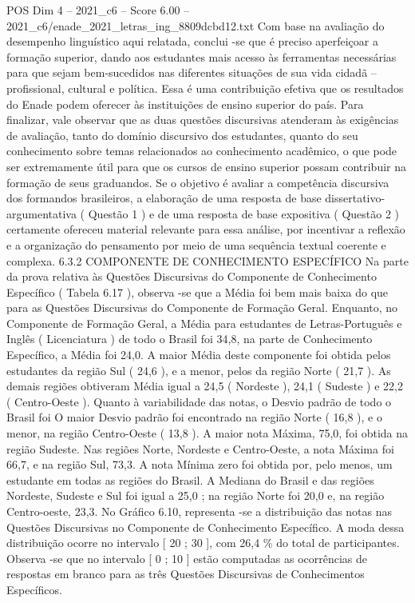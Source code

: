 \begin{textsample}{POS Dim 4 – 2021\_c6 – Score 6.00 – 2021\_c6/enade\_2021\_letras\_ing\_8809dcbd12.txt}
Com base na avaliação do desempenho linguístico aqui relatada, conclui -se que é preciso aperfeiçoar a formação superior, dando aos estudantes mais acesso às ferramentas necessárias para que sejam bem-sucedidos nas diferentes situações de sua vida cidadã – profissional, cultural e política.
Essa é uma contribuição efetiva que os resultados do Enade podem oferecer às instituições de ensino superior do país.
Para finalizar, vale observar que as duas questões discursivas atenderam às exigências de avaliação, tanto do domínio discursivo dos estudantes, quanto do seu conhecimento sobre temas relacionados ao conhecimento acadêmico, o que pode ser extremamente útil para que os cursos de ensino superior possam contribuir na formação de seus graduandos.
Se o objetivo é avaliar a competência discursiva dos formandos brasileiros, a elaboração de uma resposta de base dissertativo-argumentativa ( Questão 1 ) e de uma resposta de base expositiva ( Questão 2 ) certamente ofereceu material relevante para essa análise, por incentivar a reflexão e a organização do pensamento por meio de uma sequência textual coerente e complexa. 6.3.2 COMPONENTE DE CONHECIMENTO ESPECÍFICO Na parte da prova relativa às Questões Discursivas do Componente de Conhecimento Específico ( Tabela 6.17 ), observa -se que a Média foi bem mais baixa do que para as Questões Discursivas do Componente de Formação Geral.
Enquanto, no Componente de Formação Geral, a Média para estudantes de Letras-Português e Inglês ( Licenciatura ) de todo o Brasil foi 34,8, na parte de Conhecimento Específico, a Média foi 24,0.
A maior Média deste componente foi obtida pelos estudantes da região Sul ( 24,6 ), e a menor, pelos da região Norte ( 21,7 ).
As demais regiões obtiveram Média igual a 24,5 ( Nordeste ), 24,1 ( Sudeste ) e 22,2 ( Centro-Oeste ).
Quanto à variabilidade das notas, o Desvio padrão de todo o Brasil foi O maior Desvio padrão foi encontrado na região Norte ( 16,8 ), e o menor, na região Centro-Oeste ( 13,8 ).
A maior nota Máxima, 75,0, foi obtida na região Sudeste.
Nas regiões Norte, Nordeste e Centro-Oeste, a nota Máxima foi 66,7, e na região Sul, 73,3.
A nota Mínima zero foi obtida por, pelo menos, um estudante em todas as regiões do Brasil.
A Mediana do Brasil e das regiões Nordeste, Sudeste e Sul foi igual a 25,0 ; na região Norte foi 20,0 e, na região Centro-oeste, 23,3.
No Gráfico 6.10, representa -se a distribuição das notas nas Questões Discursivas no Componente de Conhecimento Específico.
A moda dessa distribuição ocorre no intervalo [ 20 ; 30 ], com 26,4 \% do total de participantes.
Observa -se que no intervalo [ 0 ; 10 ] estão computadas as ocorrências de respostas em branco para as três Questões Discursivas de Conhecimentos Específicos.

\end{textsample}
